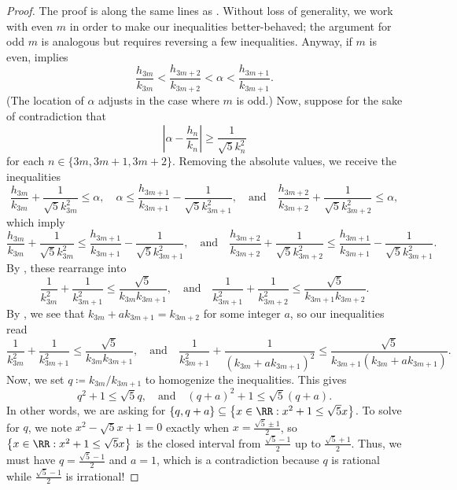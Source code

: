 \documentclass[../notes.tex]{subfiles}
\begin{document}
\begin{proof}
	The proof is along the same lines as . Without loss of generality, we work with even $m$ in order to make our inequalities better-behaved; the argument for odd $m$ is analogous but requires reversing a few inequalities. Anyway, if $m$ is even,  implies
	\[\frac{h_{3m}}{k_{3m}}<\frac{h_{3m+2}}{k_{3m+2}}<\alpha<\frac{h_{3m+1}}{k_{3m+1}}.\]
	(The location of $\alpha$ adjusts in the case where $m$ is odd.) Now, suppose for the sake of contradiction that
	\[\left|\alpha-\frac{h_n}{k_n}\right|\ge\frac1{\sqrt 5k_n^2}\]
	for each $n\in\{3m,3m+1,3m+2\}$. Removing the absolute values, we receive the inequalities
	\[\frac{h_{3m}}{k_{3m}}+\frac1{\sqrt5k_{3m}^2}\le\alpha,\quad\alpha\le\frac{h_{3m+1}}{k_{3m+1}}-\frac1{\sqrt5k_{3m+1}^2},\quad\text{and}\quad\frac{h_{3m+2}}{k_{3m+2}}+\frac1{\sqrt5k_{3m+2}^2}\le\alpha,\]
	which imply
	\[\frac{h_{3m}}{k_{3m}}+\frac1{\sqrt5k_{3m}^2}\le\frac{h_{3m+1}}{k_{3m+1}}-\frac1{\sqrt5k_{3m+1}^2},\quad\text{and}\quad\frac{h_{3m+2}}{k_{3m+2}}+\frac1{\sqrt5k_{3m+2}^2}\le\frac{h_{3m+1}}{k_{3m+1}}-\frac1{\sqrt5k_{3m+1}^2}.\]
	By , these rearrange into
	\[\frac1{k_{3m}^2}+\frac1{k_{3m+1}^2}\le\frac{\sqrt5}{k_{3m}k_{3m+1}},\quad\text{and}\quad\frac1{k_{3m+1}^2}+\frac1{k_{3m+2}^2}\le\frac{\sqrt5}{k_{3m+1}k_{3m+2}}.\]
	By , we see that $k_{3m}+ak_{3m+1}=k_{3m+2}$ for some integer $a$, so our inequalities read
	\[\frac1{k_{3m}^2}+\frac1{k_{3m+1}^2}\le\frac{\sqrt5}{k_{3m}k_{3m+1}},\quad\text{and}\quad\frac1{k_{3m+1}^2}+\frac1{(k_{3m}+ak_{3m+1})^2}\le\frac{\sqrt5}{k_{3m+1}(k_{3m}+ak_{3m+1})}.\]
	Now, we set $q\coloneqq k_{3m}/k_{3m+1}$ to homogenize the inequalities. This gives
	\[q^2+1\le\sqrt5q,\quad\text{and}\quad(q+a)^2+1\le\sqrt5(q+a).\]
	In other words, we are asking for $\{q,q+a\}\subseteq\left\{x\in\RR:x^2+1\le\sqrt 5x\right\}$. To solve for $q$, we note $x^2-\sqrt5x+1=0$ exactly when $x=\frac{\sqrt5\pm1}2$, so $\left\{x\in\RR:x^2+1\le\sqrt 5x\right\}$ is the closed interval from $\frac{\sqrt5-1}2$ up to $\frac{\sqrt5+1}2$. Thus, we must have $q=\frac{\sqrt5-1}2$ and $a=1$, which is a contradiction because $q$ is rational while $\frac{\sqrt5-1}2$ is irrational!
\end{proof}
\end{document}
